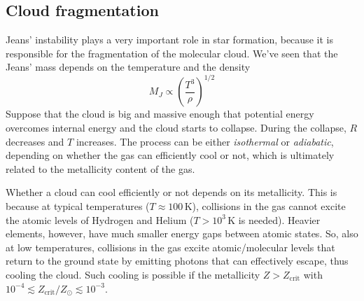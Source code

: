 \subsection{Cloud fragmentation}
Jeans' instability plays a very important role in star formation, because it is responsible for the fragmentation of the molecular cloud. We've seen that the Jeans' mass depends on the temperature and the density 
\begin{equation*}
    M_{J}\propto \left(\frac{T^{3}}{\rho}\right)^{1/2}
\end{equation*}
Suppose that the cloud is big and massive enough that potential energy overcomes internal energy and the cloud starts to collapse. During the collapse, $R$
decreases and $T$ increases. The process can be either \emph{isothermal} or \emph{adiabatic}, depending on whether the gas can eﬃciently cool or not, which is ultimately
related to the metallicity content of the gas.
\par Whether a cloud can cool eﬃciently or not depends on its metallicity. This is because at typical temperatures ($T \approx 100\,\text{K}$), collisions in the gas cannot excite the atomic levels of Hydrogen and Helium ($T > 10^{3}\,\text{K}$ is needed). Heavier elements, however, have much smaller energy gaps between atomic states. So, also at low temperatures, collisions in the gas excite atomic/molecular levels that return to the ground state by emitting photons that can effectively escape, thus cooling the cloud. Such cooling is possible if the metallicity $Z > Z_{\text{crit}}$ with $10^{-4}\lesssim Z_{\text{crit}}/Z_{\odot}\lesssim 10^{-3}$.
